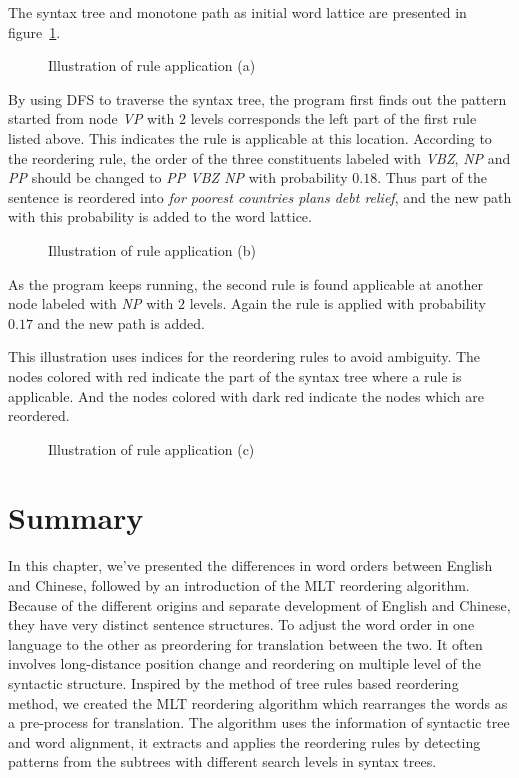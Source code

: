 The syntax tree and monotone path as initial word lattice are presented in figure~\ref{Ia}.
\begin{figure}
\centering
\subfigure{

}
\subfigure{

}
\caption{Illustration of rule application (a)}
\label{Ia}
\end{figure}

By using DFS to traverse the syntax tree, the program first finds out the pattern started from node \emph{VP} with $2$ levels corresponds the left part of the first rule listed above. This indicates the rule is applicable at this location. According to the reordering rule, the order of the three constituents labeled with \emph{VBZ}, \emph{NP} and \emph{PP} should be changed to \emph{PP VBZ NP} with probability $0.18$. Thus part of the sentence is reordered into \emph{for poorest countries plans debt relief}, and the new path with this probability is added to the word lattice.

\begin{figure}
\centering
\subfigure{

}
\subfigure{

}
\caption{Illustration of rule application (b)}
\end{figure}

As the program keeps running, the second rule is found applicable at another node labeled with \emph{NP} with $2$ levels. Again the rule is applied with probability $0.17$ and the new path is added. 

This illustration uses indices for the reordering rules to avoid ambiguity. The nodes colored with red indicate the part of the syntax tree where a rule is applicable. And the nodes colored with dark red indicate the nodes which are reordered.

\begin{figure}[H]
\centering
\subfigure{

}
\subfigure{

}
\caption{Illustration of rule application (c)}
\end{figure}

\section{Summary}
In this chapter, we've presented the differences in word orders between English and Chinese, followed by an introduction of the MLT reordering algorithm. Because of the different origins and separate development of English and Chinese, they have very distinct sentence structures. To adjust the word order in one language to the other as preordering for translation between the two. It often involves long-distance position change and reordering on multiple level of the syntactic structure. Inspired by the method of tree rules based reordering method, we created the MLT reordering algorithm which rearranges the words as a pre-process for translation. The algorithm uses the information of syntactic tree and word alignment, it extracts and applies the reordering rules by detecting patterns from the subtrees with different search levels in syntax trees.
